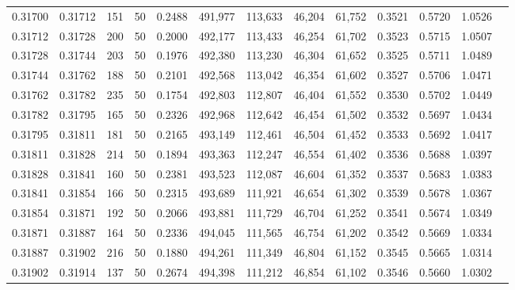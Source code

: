 \begin{tabular}{rrrrrrrrrrrrr}
0.31700 & 0.31712 &   151 &  50 &                                     0.2488 & 491,977 & 113,633 &  46,204 &  61,752 & 0.3521 & 0.5720 & 1.0526 \\
0.31712 & 0.31728 &   200 &  50 &                                     0.2000 & 492,177 & 113,433 &  46,254 &  61,702 & 0.3523 & 0.5715 & 1.0507 \\
0.31728 & 0.31744 &   203 &  50 &                                     0.1976 & 492,380 & 113,230 &  46,304 &  61,652 & 0.3525 & 0.5711 & 1.0489 \\
0.31744 & 0.31762 &   188 &  50 &                                     0.2101 & 492,568 & 113,042 &  46,354 &  61,602 & 0.3527 & 0.5706 & 1.0471 \\
0.31762 & 0.31782 &   235 &  50 &                                     0.1754 & 492,803 & 112,807 &  46,404 &  61,552 & 0.3530 & 0.5702 & 1.0449 \\
0.31782 & 0.31795 &   165 &  50 &                                     0.2326 & 492,968 & 112,642 &  46,454 &  61,502 & 0.3532 & 0.5697 & 1.0434 \\
0.31795 & 0.31811 &   181 &  50 &                                     0.2165 & 493,149 & 112,461 &  46,504 &  61,452 & 0.3533 & 0.5692 & 1.0417 \\
0.31811 & 0.31828 &   214 &  50 &                                     0.1894 & 493,363 & 112,247 &  46,554 &  61,402 & 0.3536 & 0.5688 & 1.0397 \\
0.31828 & 0.31841 &   160 &  50 &                                     0.2381 & 493,523 & 112,087 &  46,604 &  61,352 & 0.3537 & 0.5683 & 1.0383 \\
0.31841 & 0.31854 &   166 &  50 &                                     0.2315 & 493,689 & 111,921 &  46,654 &  61,302 & 0.3539 & 0.5678 & 1.0367 \\
0.31854 & 0.31871 &   192 &  50 &                                     0.2066 & 493,881 & 111,729 &  46,704 &  61,252 & 0.3541 & 0.5674 & 1.0349 \\
0.31871 & 0.31887 &   164 &  50 &                                     0.2336 & 494,045 & 111,565 &  46,754 &  61,202 & 0.3542 & 0.5669 & 1.0334 \\
0.31887 & 0.31902 &   216 &  50 &                                     0.1880 & 494,261 & 111,349 &  46,804 &  61,152 & 0.3545 & 0.5665 & 1.0314 \\
0.31902 & 0.31914 &   137 &  50 &                                     0.2674 & 494,398 & 111,212 &  46,854 &  61,102 & 0.3546 & 0.5660 & 1.0302 \\

\end{tabular}
